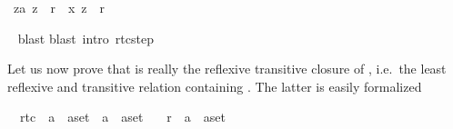 \begin{isabellebody}
\begin{isamarkuptxt}
\begin{isabelle}
\ {}za{}\ z{}\ {}\ r{}\ {}\ {}x{}\ z{}\ {}\ r{}%
\end{isabelle}%
\end{isamarkuptxt}%
\isamarkuptrue%
\ \isamarkupfalse%
{}blast{}\isanewline
{}\isamarkupfalse%
{}blast\ intro{}\ rtc{}step{}\isanewline
{}\isamarkupfalse%
%
\endisatagproof
{\isafoldproof}%
%
\isadelimproof
%
\endisadelimproof
%
\begin{isamarkuptext}%
Let us now prove that  is really the reflexive transitive closure
of , i.e.\ the least reflexive and transitive
relation containing . The latter is easily formalized%
\end{isamarkuptext}%
\isamarkuptrue%
\isamarkupfalse%
\isanewline
\ \ rtc{}\ {}{}\ {}{}{}a\ {}\ {}a{}set\ {}\ {}{}a\ {}\ {}a{}set{}\isanewline
\ \ \ r\ {}{}\ {}{}{}a\ {}\ {}a{}set{}\isanewline

\end{isabellebody}
